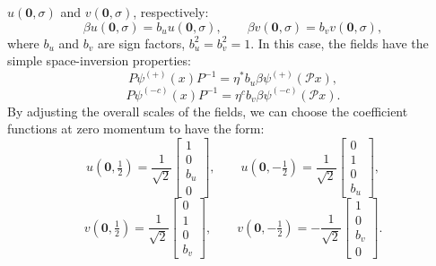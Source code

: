 $u(\mathbf0,\sigma)$ and $v(\mathbf0,\sigma)$, respectively:
\begin{equation}
\beta u(\mathbf0,\sigma)=b_u u(\mathbf0,\sigma),
\qquad
\beta v(\mathbf0,\sigma)=b_v v(\mathbf0,\sigma),
\tag{5.5.14}\label{eq:5.5.14}
\end{equation}
where $b_u$ and $b_v$ are sign factors, $b_u^2=b_v^2=1$. In this case, the
fields have the simple space-inversion properties:
\begin{equation}
P\psi^{(+)}(x)P^{-1}=\eta^*b_u\beta\psi^{(+)}(\mathcal P x),
\tag{5.5.15}\label{eq:5.5.15}
\end{equation}
\begin{equation}
P\psi^{(-c)}(x)P^{-1}=\eta^c b_v\beta\psi^{(-c)}(\mathcal P x).
\tag{5.5.16}\label{eq:5.5.16}
\end{equation}
By adjusting the overall scales of the fields, we can choose the coefficient
functions at zero momentum to have the form:
\begin{equation}
u(\mathbf0,\tfrac12)=\frac1{\sqrt2}\begin{bmatrix}1\\0\\b_u\\0\end{bmatrix},
\qquad
u(\mathbf0,-\tfrac12)=\frac1{\sqrt2}\begin{bmatrix}0\\1\\0\\b_u\end{bmatrix},
\tag{5.5.17}\label{eq:5.5.17}
\end{equation}
\begin{equation}
v(\mathbf0,\tfrac12)=\frac1{\sqrt2}\begin{bmatrix}0\\1\\0\\b_v\end{bmatrix},
\qquad
v(\mathbf0,-\tfrac12)=-\frac1{\sqrt2}\begin{bmatrix}1\\0\\b_v\\0\end{bmatrix}.
\tag{5.5.18}\label{eq:5.5.18}
\end{equation}

